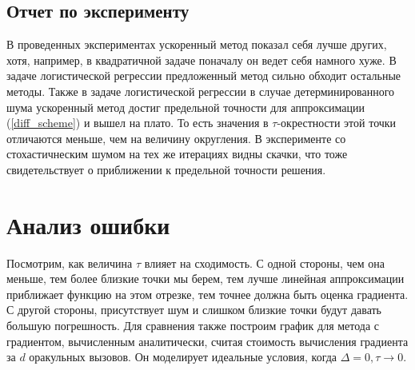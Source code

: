 \documentclass{article}
\begin{document}
\subsection{Отчет по эксперименту}
В проведенных экспериментах ускоренный метод показал себя лучше других, хотя, например, в квадратичной задаче поначалу он ведет себя намного хуже. В задаче логистической регрессии предложенный метод сильно обходит остальные методы. Также в задаче логистической регрессии в случае детерминированного шума ускоренный метод достиг предельной точности для аппроксимации (\ref{diff_scheme}) и вышел на плато. То есть значения в $\tau$-окрестности этой точки отличаются меньше, чем на величину округления. В эксперименте со стохастичнеским шумом на тех же итерациях видны скачки, что тоже свидетельствует о приближении к предельной точности решения.
\section{Анализ ошибки}
Посмотрим, как величина $\tau$ влияет на сходимость. С одной стороны, чем она меньше, тем более близкие точки мы берем, тем лучше линейная аппроксимации приближает функцию на этом отрезке, тем точнее должна быть оценка градиента. С другой стороны, присутствует шум и слишком близкие точки будут давать большую погрешность. Для сравнения также построим график для метода с градиентом, вычисленным аналитически, считая стоимость вычисления градиента за $d$ оракульных вызовов. Он моделирует идеальные условия, когда $\Delta = 0, \tau \to 0$.
\end{document}
